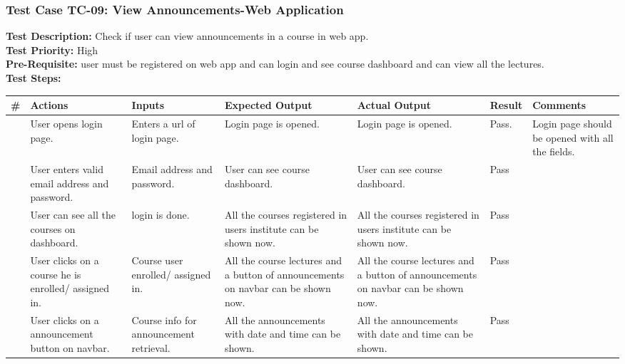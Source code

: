 \documentclass[12pt]{article}
\begin{document}
\subsubsection{Test Case TC-09: View Announcements-Web Application}
\textbf{Test Description: } Check if user can view announcements in a course in web app. \\
\textbf{Test Priority: } High \\
\textbf{Pre-Requisite: } user must be registered on web app and can login and see course dashboard and can view all the lectures. \\
\textbf{Test Steps: }
\begin{longtable}{ |>{\raggedright\arraybackslash} p{0.7cm} | >{\raggedright\arraybackslash}p{2cm}|>{\raggedright\arraybackslash} p{2cm} |>{\raggedright\arraybackslash} p{2.5cm} |>{\raggedright\arraybackslash} p{2.5cm} |>{\raggedright\arraybackslash} p{1.3cm} |>{\raggedright\arraybackslash} p{2.5cm} | } 
\hline
\textbf{\#}
& \textbf{Actions} 
& \textbf{Inputs}
& \textbf{Expected Output} 
& \textbf{Actual Output} 
& \textbf{Result} 
& \textbf{Comments} 
\\ 
\hline
1
& User opens login page. 
& Enters a url of login page.
& Login page is opened.
& Login page is opened.
& Pass.
& Login page should be opened with all the fields.
\\ 
\hline
2 
& User enters valid email address and password.
& Email address and password.
& User can see course dashboard.
& User can see course dashboard. 
& Pass
&  
\\ 
\hline
3
& User can see all the courses on dashboard.
& login is done.
& All the courses registered in users institute can be shown now.
& All the courses registered in users institute can be shown now. 
& Pass
&  
\\ 
\hline
4
& User clicks on a course he is enrolled/ assigned in.
& Course user enrolled/ assigned in.
& All the course lectures and a button of announcements on navbar can be shown now.
& All the course lectures and a button of announcements on navbar can be shown now. 
& Pass
&  
\\ 
\hline
5
& User clicks on a announcement button on navbar.
& Course info for announcement retrieval.
& All the announcements with date and time can be shown.
& All the announcements with date and time can be shown. 
& Pass
&  
\\ 
\hline

\end{longtable}

\mbox\\
\end{document}
